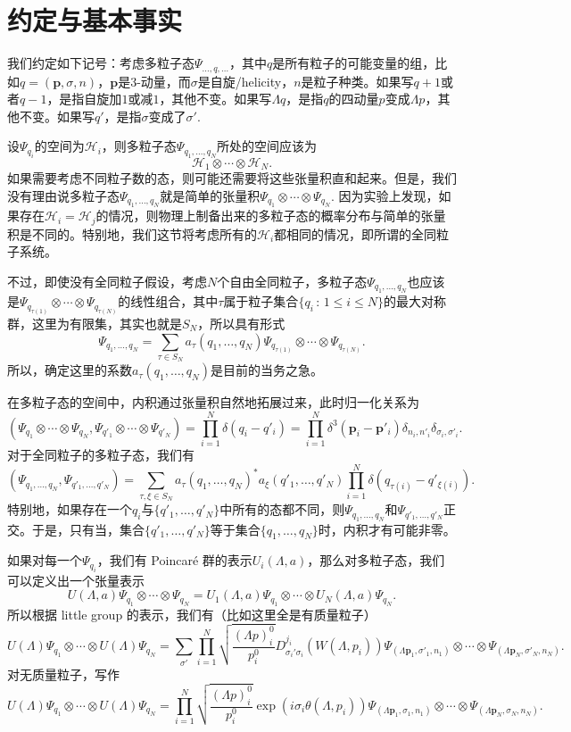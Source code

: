 \documentclass[11pt]{article}
\theoremstyle{definition}
\theoremstyle{plain}
\begin{document}
\section{约定与基本事实}

我们约定如下记号：考虑多粒子态$\Psi_{\dots,q,\dots}$，其中$q$是所有粒子的可能变量的组，比如$q=(\bm{p},\sigma,n)$，$\bm{p}$是3-动量，而$\sigma$是自旋/helicity，$n$是粒子种类。如果写$q+1$或者$q-1$，是指自旋加$1$或减$1$，其他不变。如果写$\Lambda q$，是指$q$的四动量$p$变成$\Lambda p$，其他不变。如果写$q'$，是指$\sigma$变成了$\sigma'$.

设$\Psi_{q_i}$的空间为$\mathcal{H}_i$，则多粒子态$\Psi_{q_1,\dots,q_N}$所处的空间应该为
\[
	\mathcal{H}_{1}\otimes\cdots\otimes \mathcal{H}_{N}.
\]
如果需要考虑不同粒子数的态，则可能还需要将这些张量积直和起来。但是，我们没有理由说多粒子态$\Psi_{q_1,\dots,q_N}$就是简单的张量积$\Psi_{q_1}\otimes\cdots\otimes \Psi_{q_N}$. 因为实验上发现，如果存在$\mathcal{H}_i=\mathcal{H}_j$的情况，则物理上制备出来的多粒子态的概率分布与简单的张量积是不同的。特别地，我们这节将考虑所有的$\mathcal{H}_i$都相同的情况，即所谓的全同粒子系统。%

不过，即使没有全同粒子假设，考虑$N$个自由全同粒子，多粒子态$\Psi_{q_1,\dots,q_N}$也应该是$\Psi_{q_{\tau(1)}}\otimes\cdots\otimes \Psi_{q_{\tau(N)}}$的线性组合，其中$\tau$属于粒子集合$\{q_i\,:\,1\leq i \leq N\}$的最大对称群，这里为有限集，其实也就是$S_N$，所以具有形式
\[
	\Psi_{q_1,\dots,q_N}=\sum_{\tau\in S_N}a_\tau(q_1,\dots,q_N)\Psi_{q_{\tau(1)}}\otimes\cdots\otimes \Psi_{q_{\tau(N)}}.
\]
所以，确定这里的系数$a_\tau(q_1,\dots,q_N)$是目前的当务之急。

在多粒子态的空间中，内积通过张量积自然地拓展过来，此时归一化关系为
\[
	(\Psi_{q_1}\otimes\cdots\otimes \Psi_{q_N},\Psi_{q'_1}\otimes\cdots\otimes \Psi_{q'_N})=\prod_{i=1}^N \delta(q_i-q'_i)=\prod_{i=1}^N \delta^3(\bm{p}_i-\bm{p}'_i)\delta_{n_i,n'_i}\delta_{\sigma_i,\sigma'_i}.
\]
对于全同粒子的多粒子态，我们有
\[
	(\Psi_{q_1,\dots,q_N},\Psi_{q'_1,\dots,q'_N})=\sum_{\tau,\xi\in S_N}a_\tau(q_{1},\dots,q_{N})^*a_\xi(q'_{1},\dots,q'_{N})\prod_{i=1}^N \delta(q_{\tau(i)}-q'_{\xi(i)}).
\]
特别地，如果存在一个$q_i$与$\{q'_1,\dots,q'_N\}$中所有的态都不同，则$\Psi_{q_1,\dots,q_N}$和$\Psi_{q'_1,\dots,q'_N}$正交。于是，只有当，集合$\{q'_1,\dots,q'_N\}$等于集合$\{q_1,\dots,q_N\}$时，内积才有可能非零。

如果对每一个$\Psi_{q_i}$，我们有 Poincar\'{e} 群的表示$U_i(\Lambda,a)$，那么对多粒子态，我们可以定义出一个张量表示
\[
	U(\Lambda,a)\Psi_{q_1}\otimes\cdots\otimes \Psi_{q_N}=U_1(\Lambda,a)\Psi_{q_1}\otimes\cdots\otimes U_N(\Lambda,a)\Psi_{q_N}.
\]
所以根据 little group 的表示，我们有（比如这里全是有质量粒子）
\[
	U(\Lambda)\Psi_{q_1}\otimes\cdots\otimes U(\Lambda)\Psi_{q_N}=\sum_{\sigma'}\prod_{i=1}^N \sqrt{\frac{(\Lambda p)^0_i}{p^0_i}}D^{j_i}_{\sigma_i'\sigma_i}(W(\Lambda,p_i))\Psi_{(\Lambda \bm{p}_1,\sigma'_1,n_1)}\otimes \cdots\otimes \Psi_{(\Lambda \bm{p}_N,\sigma'_N,n_N)}.
\]
对无质量粒子，写作
\[
	U(\Lambda)\Psi_{q_1}\otimes\cdots\otimes U(\Lambda)\Psi_{q_N}=\prod_{i=1}^N \sqrt{\frac{(\Lambda p)^0_i}{p^0_i}}\exp(i\sigma_i \theta(\Lambda,p_i))\Psi_{(\Lambda \bm{p}_1,\sigma_1,n_1)}\otimes \cdots\otimes \Psi_{(\Lambda \bm{p}_N,\sigma_N,n_N)}.
\]
\end{document}
